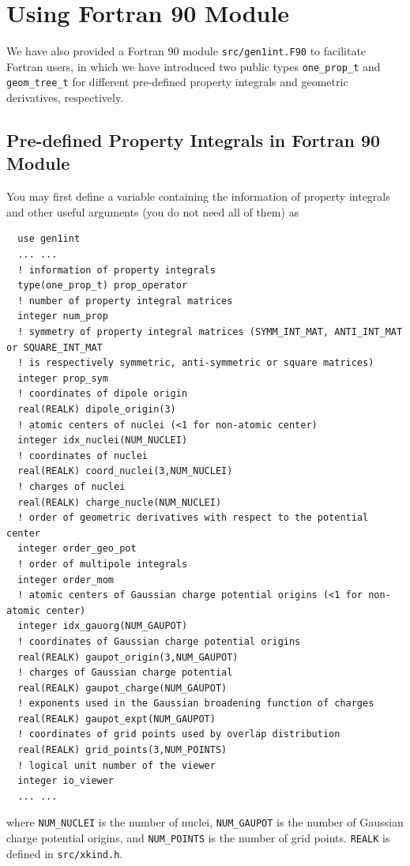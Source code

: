 \documentclass[a4paper,11pt,twoside,openright]{book}
\begin{document}
\section{Using Fortran 90 Module}
\label{sect:fortran-module}

We have also provided a Fortran 90 module \verb|src/gen1int.F90| to facilitate Fortran users, in which
we have introduced two public types \verb|one_prop_t| and
\verb|geom_tree_t| for different pre-defined
property integrals and geometric derivatives, respectively.

\subsection{Pre-defined Property Integrals in Fortran 90 Module}
\label{subsec:f90-property}

You may first define a variable containing the information of property integrals and other useful arguments
(you do not need all of them) as
\begin{verbatim}
  use gen1int
  ... ...
  ! information of property integrals
  type(one_prop_t) prop_operator
  ! number of property integral matrices
  integer num_prop
  ! symmetry of property integral matrices (SYMM_INT_MAT, ANTI_INT_MAT or SQUARE_INT_MAT
  ! is respectively symmetric, anti-symmetric or square matrices)
  integer prop_sym
  ! coordinates of dipole origin
  real(REALK) dipole_origin(3)
  ! atomic centers of nuclei (<1 for non-atomic center)
  integer idx_nuclei(NUM_NUCLEI)
  ! coordinates of nuclei
  real(REALK) coord_nuclei(3,NUM_NUCLEI)
  ! charges of nuclei
  real(REALK) charge_nucle(NUM_NUCLEI)
  ! order of geometric derivatives with respect to the potential center
  integer order_geo_pot
  ! order of multipole integrals
  integer order_mom
  ! atomic centers of Gaussian charge potential origins (<1 for non-atomic center)
  integer idx_gauorg(NUM_GAUPOT)
  ! coordinates of Gaussian charge potential origins
  real(REALK) gaupot_origin(3,NUM_GAUPOT)
  ! charges of Gaussian charge potential
  real(REALK) gaupot_charge(NUM_GAUPOT)
  ! exponents used in the Gaussian broadening function of charges
  real(REALK) gaupot_expt(NUM_GAUPOT)
  ! coordinates of grid points used by overlap distribution
  real(REALK) grid_points(3,NUM_POINTS)
  ! logical unit number of the viewer
  integer io_viewer
  ... ...
\end{verbatim}
where \verb|NUM_NUCLEI| is the number of nuclei, \verb|NUM_GAUPOT| is the number of Gaussian
charge potential origins, and \verb|NUM_POINTS| is the number of grid points. \verb|REALK| is defined
in \verb|src/xkind.h|.
\end{document}

